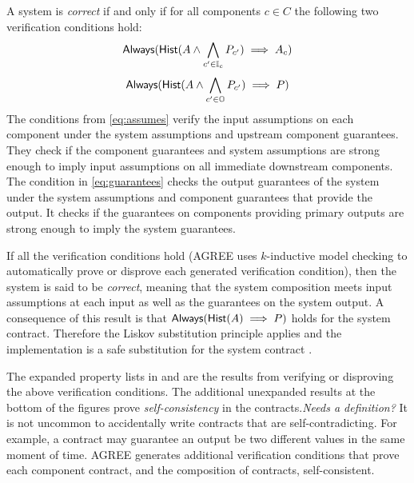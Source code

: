 A system is
\emph{correct} if and only if for all components $c \in C$ the
following two verification conditions hold:
\begin{equation}\label{eq:assumes}
            \mathsf{Always}(\mathsf{Hist}(A \wedge
            \bigwedge_{c^\prime \in \mathbb{I}_{c}} P_{c^\prime})
            \implies A_{c})
\end{equation}
\begin{equation}\label{eq:guarantees}
            \mathsf{Always}(\mathsf{Hist}(A \wedge
            \bigwedge_{c^\prime \in \mathbb{O}} P_{c^\prime})
            \implies P)
\end{equation}
The conditions from \eqref{eq:assumes} verify the input assumptions on
each component under the system assumptions and upstream component
guarantees.  They check if the component guarantees and system
assumptions are strong enough to imply input assumptions on all
immediate downstream components.  The condition in
\eqref{eq:guarantees} checks the output guarantees of the system under
the system assumptions and component guarantees that provide the
output.  It checks if the guarantees on components providing primary
outputs are strong enough to imply the system guarantees.

If all the verification conditions hold (AGREE uses $k$-inductive
model checking to automatically prove or disprove each generated
verification condition), then the system is said to be \emph{correct},
meaning that the system composition meets input assumptions at each
input as well as the guarantees on the system output. A consequence of
this result is that $\mathsf{Always}(\mathsf{Hist}(A) \implies
P)$ holds for the system contract.  Therefore the Liskov
substitution principle applies and the implementation is a safe
substitution for the system contract \cite{10.1145/62139.62141}.

The expanded property lists in  and
 are the results from verifying or
disproving the above verification conditions.  The additional
unexpanded results at the bottom of the figures prove
\emph{self-consistency} in the contracts.\emph{Needs a definition?}  It is not uncommon to
accidentally write contracts that are self-contradicting.  For
example, a contract may guarantee an output be two different values in
the same moment of time.  AGREE generates additional verification
conditions that prove each component contract, and the composition of
contracts, self-consistent.
